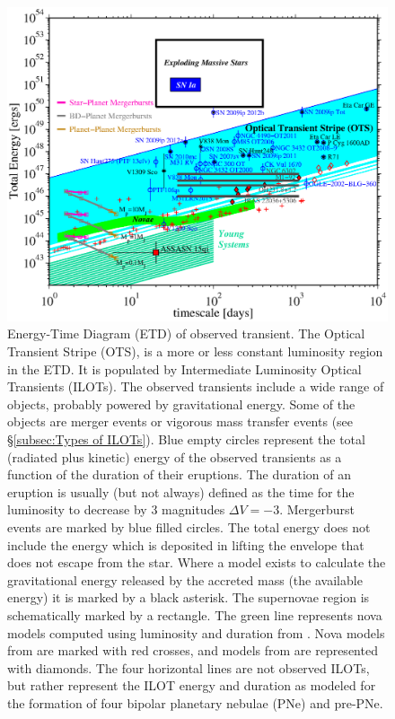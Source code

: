 \documentclass[modern]{aastex62}
\begin{document}
\begin{figure}[ht!]
\begin{center}
\includegraphics[width=1.0\textwidth]{etd.eps}
\end{center}
\caption{Energy-Time Diagram (ETD) of observed transient. The Optical Transient Stripe (OTS), is a more or less constant luminosity region in the ETD. It is populated by Intermediate Luminosity Optical Transients (ILOTs). The observed transients include a wide range of objects, probably powered by gravitational energy.
Some of the objects are merger events or vigorous mass transfer events (see \S\ref{subsec:Types of ILOTs}). Blue empty circles represent the total (radiated plus kinetic) energy of the observed transients as a function of the duration of their eruptions. The duration of an eruption is usually (but not always) defined as the time for the luminosity to decrease by 3 magnitudes $\Delta V=-3$. 
Mergerburst events are marked by blue filled circles.
The total energy does not include the energy which is deposited in lifting the envelope that does not escape from the star. Where a model exists to calculate the gravitational energy released by the accreted mass (the available energy) it is marked by a black asterisk.
The supernovae region is schematically marked by a rectangle. The green line represents nova models computed using luminosity and duration from \cite{1995ApJ...452..704D}. Nova models from \cite{2005ApJ...623..398Y} are marked with red crosses, and models from \cite{2010ApJ...725..831S} are represented with diamonds.
The four horizontal lines are not observed ILOTs, but rather represent the ILOT energy and duration as \cite{2012ApJ...746..100S} modeled for the formation of four bipolar planetary nebulae (PNe) and pre-PNe.
}\label{fig:ilot-club}
\end{figure}
\end{document}
